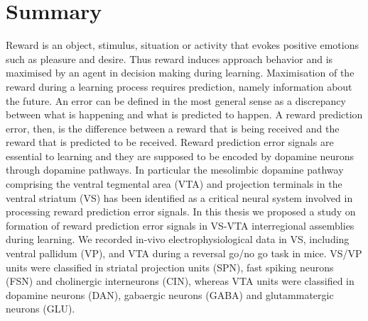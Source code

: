 \section*{Summary}
Reward is an object, stimulus, situation or activity that evokes positive emotions such as pleasure and desire. Thus reward induces approach behavior and is maximised by an agent in decision making during learning. Maximisation of the reward during a learning process requires prediction, namely information about the future. An error can be defined in the most general sense as a discrepancy between what is happening and what is predicted to happen. A reward prediction error, then, is the difference between a reward that is being received and the reward that is predicted to be received. Reward prediction error signals are essential to learning and they are supposed to be encoded by dopamine neurons through dopamine pathways. In particular the mesolimbic dopamine pathway comprising the ventral tegmental area (VTA) and projection terminals in the ventral striatum (VS) has been identified as a critical neural system involved in processing reward prediction error signals. In this thesis we proposed a study on formation of reward prediction error signals in VS-VTA interregional assemblies during learning. We recorded in-vivo electrophysiological data in VS, including ventral pallidum (VP), and VTA during a reversal go/no go task in mice. VS/VP units were classified in striatal projection units (SPN), fast spiking neurons (FSN) and cholinergic interneurons (CIN), whereas VTA units were classified in dopamine neurons (DAN), gabaergic neurons (GABA) and glutammatergic neurons (GLU).
